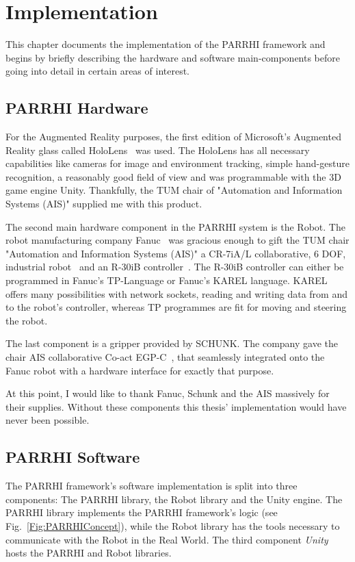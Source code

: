 \chapter{Implementation}\label{Chap:Implementation}

This chapter documents the implementation of the PARRHI framework and begins by briefly describing the hardware and software main-components before going into detail in certain areas of interest.

\section{PARRHI Hardware}
For the Augmented Reality purposes, the first edition of Microsoft's Augmented Reality glass called HoloLens~\cite{HoloLens} was used. The HoloLens has all necessary capabilities like cameras for image and environment tracking, simple hand-gesture recognition, a reasonably good field of view and was programmable with the 3D game engine Unity. Thankfully, the TUM chair of "Automation and Information Systems (AIS)" supplied me with this product.

The second main hardware component in the PARRHI system is the Robot. The robot manufacturing company Fanuc~\cite{Fanuc} was gracious enough to gift the TUM chair "Automation and Information Systems (AIS)" a CR-7iA/L collaborative, 6 DOF, industrial robot~\cite{FanucCR7} and an R-30iB controller~\cite{FanucR30iB}. The R-30iB controller can either be programmed in Fanuc's TP-Language or Fanuc's KAREL language. KAREL offers many possibilities with network sockets, reading and writing data from and to the robot's controller, whereas TP programmes are fit for moving and steering the robot.

The last component is a gripper provided by SCHUNK. The company gave the chair AIS collaborative Co-act EGP-C~\cite{SchunkGripper}, that seamlessly integrated onto the Fanuc robot with a hardware interface for exactly that purpose. 

At this point, I would like to thank Fanuc, Schunk and the AIS massively for their supplies. Without these components this thesis' implementation would have never been possible.

\section{PARRHI Software}\label{Section:PARRHIHardware}
The PARRHI framework's software implementation is split into three components: The PARRHI library, the Robot library and the Unity engine. The PARRHI library implements the PARRHI framework's logic (see Fig.~\ref{Fig:PARRHIConcept}), while the Robot library has the tools necessary to communicate with the Robot in the Real World. The third component \textit{Unity} hosts the PARRHI and Robot libraries.


